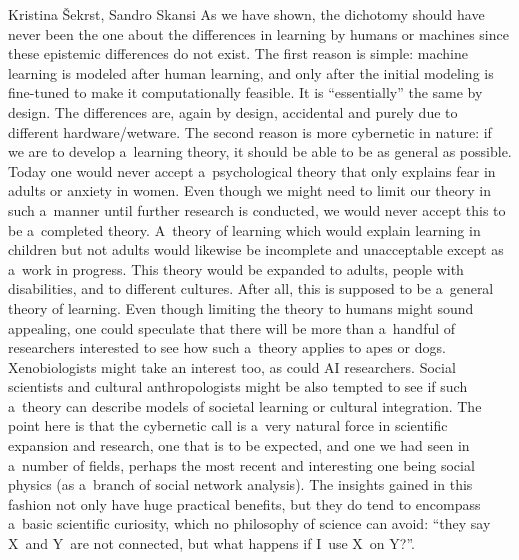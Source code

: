 \begin{artengenv2auth}{Kristina Šekrst, Sandro Skansi}
As we have shown, the dichotomy should have never been the one about the differences in learning by humans or machines since these epistemic differences do not exist. The first reason is simple: machine learning is modeled after human learning, and only after the initial modeling is fine-tuned to make it computationally feasible. It is ``essentially'' the same by design. The differences are, again by design, accidental and purely due to different hardware/wetware. The second reason is more cybernetic in nature: if we are to develop a~learning theory, it should be able to be as general as possible. Today one would never accept a~psychological theory that only explains fear in adults or anxiety in women. Even though we might need to limit our theory in such a~manner until further research is conducted, we would never accept this to be a~completed theory. A~theory of learning which would explain learning in children but not adults would likewise be incomplete and unacceptable except as a~work in progress. This theory would be expanded to adults, people with disabilities, and to different cultures. After all, this is supposed to be a~general theory of learning. Even though limiting the theory to humans might sound appealing, one could speculate that there will be more than a~handful of researchers interested to see how such a~theory applies to apes or dogs. Xenobiologists might take an interest too, as could AI researchers. Social scientists and cultural anthropologists might be also tempted to see if such a~theory can describe models of societal learning or cultural integration. The point here is that the cybernetic call is a~very natural force in scientific expansion and research, one that is to be expected, and one we had seen in a~number of fields, perhaps the most recent and interesting one being social physics (as a~branch of social network analysis). The insights gained in this fashion not only have huge practical benefits, but they do tend to encompass a~basic scientific curiosity, which no philosophy of science can avoid: ``they say X~and Y~are not connected, but what happens if I~use X~on Y?''.


\end{artengenv2auth}
